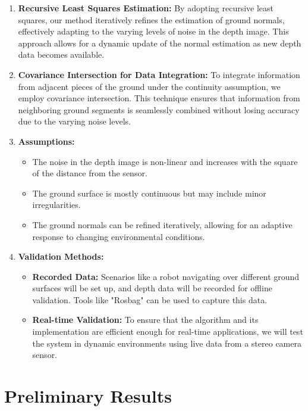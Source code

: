 \documentclass[12pt,a4paper,oneside,onecolumn]{book}
\begin{document}
\begin{enumerate}
    \item \textbf{Recursive Least Squares Estimation:} By adopting recursive least squares, our method iteratively refines the estimation of ground normals, effectively adapting to the varying levels of noise in the depth image. This approach allows for a dynamic update of the normal estimation as new depth data becomes available.
    
    \item \textbf{Covariance Intersection for Data Integration:} To integrate information from adjacent pieces of the ground under the continuity assumption, we employ covariance intersection. This technique ensures that information from neighboring ground segments is seamlessly combined without losing accuracy due to the varying noise levels.
    
    \item \textbf{Assumptions:}
    \begin{itemize}
        \item The noise in the depth image is non-linear and increases with the square of the distance from the sensor.
        \item The ground surface is mostly continuous but may include minor irregularities.
        \item The ground normals can be refined iteratively, allowing for an adaptive response to changing environmental conditions.
    \end{itemize}
    
    \item \textbf{Validation Methods:}
    \begin{itemize}
        \item \textbf{Recorded Data:} Scenarios like a robot navigating over different ground surfaces will be set up, and depth data will be recorded for offline validation. Tools like "Rosbag" can be used to capture this data.
        \item \textbf{Real-time Validation:} To ensure that the algorithm and its implementation are efficient enough for real-time applications, we will test the system in dynamic environments using live data from a stereo camera sensor.
    \end{itemize}
\end{enumerate}






\chapter{Preliminary Results}
\end{document}
